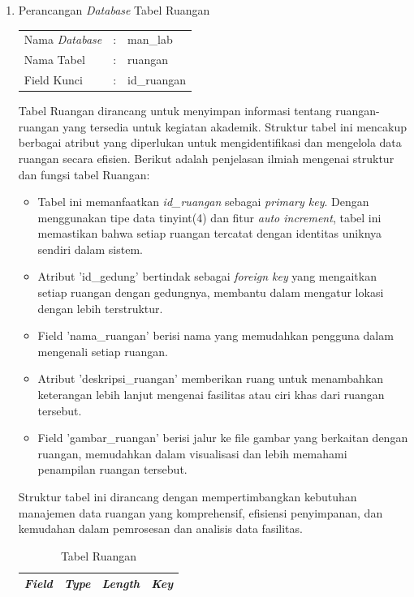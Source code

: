 \begin{enumerate}
	\item Perancangan \textit{Database} Tabel Ruangan \\
	      \begin{tabular}{lll}
		      Nama \textit{Database} & : & man\_lab    \\
		      Nama Tabel             & : & ruangan     \\
		      Field Kunci            & : & id\_ruangan \\
	      \end{tabular}

	      Tabel Ruangan dirancang untuk menyimpan informasi tentang ruangan-ruangan yang tersedia untuk kegiatan akademik. Struktur tabel ini mencakup berbagai atribut yang diperlukan untuk mengidentifikasi dan mengelola data ruangan secara efisien. Berikut adalah penjelasan ilmiah mengenai struktur dan fungsi tabel Ruangan:

	      \begin{itemize}
		      \item Tabel ini memanfaatkan \textit{id\_ruangan} sebagai \textit{primary key}. Dengan menggunakan tipe data tinyint(4) dan fitur \textit{auto increment}, tabel ini memastikan bahwa setiap ruangan tercatat dengan identitas uniknya sendiri dalam sistem.
		      \item Atribut 'id\_gedung' bertindak sebagai \textit{foreign key} yang mengaitkan setiap ruangan dengan gedungnya, membantu dalam mengatur lokasi dengan lebih terstruktur.
		      \item Field 'nama\_ruangan' berisi nama yang memudahkan pengguna dalam mengenali setiap ruangan.
		      \item Atribut 'deskripsi\_ruangan' memberikan ruang untuk menambahkan keterangan lebih lanjut mengenai fasilitas atau ciri khas dari ruangan tersebut.
		      \item Field 'gambar\_ruangan' berisi jalur ke file gambar yang berkaitan dengan ruangan, memudahkan dalam visualisasi dan lebih memahami penampilan ruangan tersebut.
	      \end{itemize}

	      Struktur tabel ini dirancang dengan mempertimbangkan kebutuhan manajemen data ruangan yang komprehensif, efisiensi penyimpanan, dan kemudahan dalam pemrosesan dan analisis data fasilitas.

		      {
			      \fontsize{10}{12}\selectfont
			      \begin{longtable}{l l l l}
				      \caption{Tabel Ruangan}
				      \label{admin}                                                                                       \\
				      \hline
				      \textbf{\textit{Field}} & \textbf{\textit{Type}} & \textbf{\textit{Length}} & \textbf{\textit{Key}} \\
				      \hline
				      \endfirsthead


\end{longtable}}
\end{enumerate}
